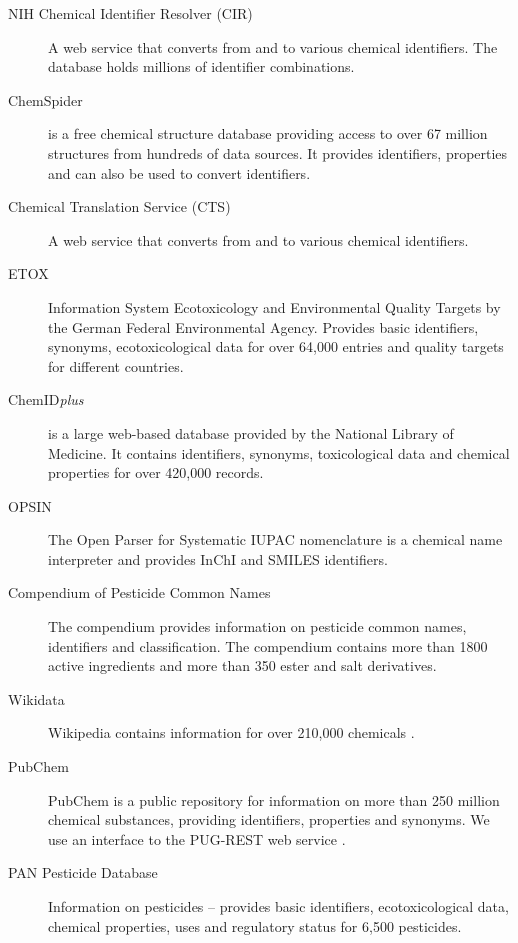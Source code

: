 \documentclass[article]{jss}
\begin{document}
\begin{description}
\item[NIH Chemical Identifier Resolver (CIR)]{\citep{cir} A web
    service that converts from and to various chemical identifiers. The database holds millions of identifier combinations.}
\item[ChemSpider]{\citep{pence_chemspider:_2010} is a free chemical
	structure database providing access to over 67 million
	structures from hundreds of data sources. It provides identifiers, properties and can also be
	used to convert identifiers.}
\item[Chemical Translation Service (CTS)]{
  \citep{Wohlgemuth_Haldiya_Willighagen_Kind_Fiehn_2010} A web
    service that converts from and to various chemical identifiers.}
\item[ETOX]{\citep{etox} Information System Ecotoxicology and
    Environmental Quality Targets by the German Federal Environmental
    Agency. Provides basic identifiers, synonyms, ecotoxicological
    data for over 64,000 entries and quality targets for different countries.}
\item[ChemID\emph{plus}]{\citep{Tomasulo_2002} is a large web-based
	database provided by the National Library of Medicine. It contains
	identifiers, synonyms, toxicological data and chemical
	properties for over 420,000 records.}
\item[OPSIN]{\citep{Lowe_Corbett_Murray-Rust_Glen_2011} The Open
	Parser for Systematic IUPAC nomenclature is a chemical name
	interpreter and provides InChI and SMILES identifiers.}
\item[Compendium of Pesticide Common Names]{\citep{wood} The
	compendium provides information on pesticide common names,
	identifiers and classification. The compendium contains more than 1800 active ingredients and more than 350 ester and salt derivatives. }
\item[Wikidata]{\citep{wiki} Wikipedia contains information for over
	210,000 chemicals
	\citep{Ertl_Patiny_Sander_Rufener_Zasso_2015}.}
\item[PubChem]{\citep{Kim_2016} PubChem is a public repository for
    information on more than 250 million chemical substances, providing identifiers,
    properties and synonyms. We use an interface to the PUG-REST web
    service \citep{Kim_Thiessen_Bolton_Bryant_2015}.}
\item[PAN Pesticide Database]{ \citep{pan} Information on pesticides --
	provides basic identifiers, ecotoxicological data, chemical
	properties, uses and regulatory status for 6,500 pesticides.}

\end{description}
\end{document}
